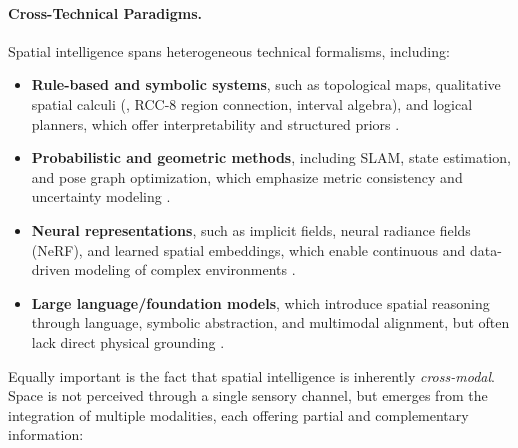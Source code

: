\paragraph{Cross-Technical Paradigms.}
Spatial intelligence spans heterogeneous technical formalisms, including:
\begin{itemize}[leftmargin=2em,itemsep=0.35em]
    \item \textbf{Rule-based and symbolic systems}, such as topological maps, qualitative spatial calculi (\eg, RCC-8 region connection, interval algebra), and logical planners, which offer interpretability and structured priors \cite{kuipers2000spatial,egenhofer1991reasoning,Randell1992RCC,allen1983maintaining}.
    \item \textbf{Probabilistic and geometric methods}, including SLAM, state estimation, and pose graph optimization, which emphasize metric consistency and uncertainty modeling \cite{Thrun2005Probabilistic,dellaert2017factor}.
    \item \textbf{Neural representations}, such as implicit fields, neural radiance fields (NeRF), and learned spatial embeddings, which enable continuous and data-driven modeling of complex environments \cite{mildenhall2021nerf,kerbl20233d}.
    \item \textbf{Large language/foundation models}, which introduce spatial reasoning through language, symbolic abstraction, and multimodal alignment, but often lack direct physical grounding \cite{driess2023palm,wu2024gpt4vt23dgen}.
\end{itemize}
Equally important is the fact that spatial intelligence is inherently \emph{cross-modal}.
Space is not perceived through a single sensory channel, but emerges from the integration of multiple modalities, each offering partial and complementary information:


